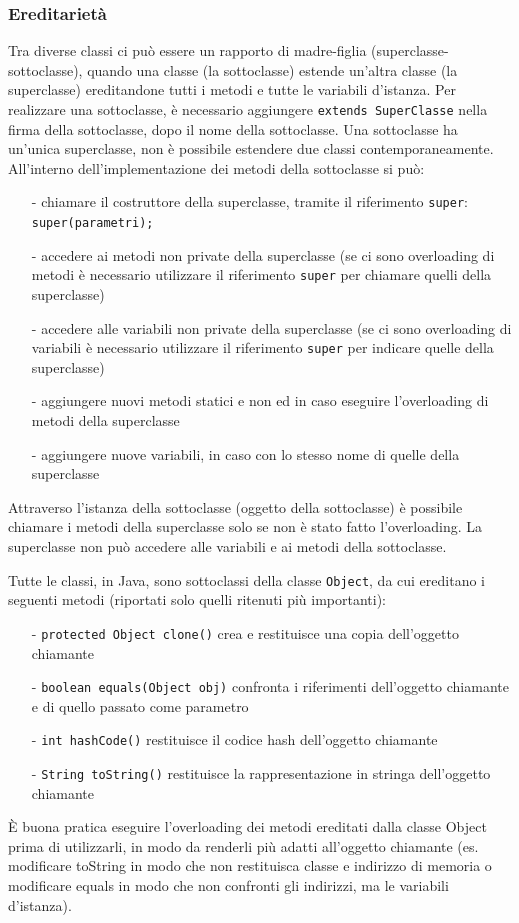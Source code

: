 \documentclass[a4paper]{article}
\begin{document}
\subsubsection*{Ereditarietà}
Tra diverse classi ci può essere un rapporto di madre-figlia (superclasse-sottoclasse), quando una classe (la sottoclasse)
estende un'altra classe (la superclasse) ereditandone tutti i metodi e tutte le variabili d'istanza.
Per realizzare una sottoclasse, è necessario aggiungere \verb|extends SuperClasse| nella firma della sottoclasse, dopo il nome
della sottoclasse. Una sottoclasse ha un'unica superclasse, non è possibile estendere due classi contemporaneamente. \\
All'interno dell'implementazione dei metodi della sottoclasse si può:
\begin{itemize} [topsep=3pt, itemsep=0pt]
	\item[-] chiamare il costruttore della superclasse, tramite il riferimento \verb|super|: \verb|super(parametri);|
	\item[-] accedere ai metodi non private della superclasse (se ci sono overloading di metodi è necessario utilizzare
	il riferimento \verb|super| per chiamare quelli della superclasse)
	\item[-] accedere alle variabili non private della superclasse (se ci sono overloading di variabili è necessario
	utilizzare il riferimento \verb|super| per indicare quelle della superclasse)
	\item[-] aggiungere nuovi metodi statici e non ed in caso eseguire l'overloading di metodi della superclasse
	\item[-] aggiungere nuove variabili, in caso con lo stesso nome di quelle della superclasse
\end{itemize}
Attraverso l'istanza della sottoclasse (oggetto della sottoclasse) è possibile chiamare i metodi della superclasse solo se
non è stato fatto l'overloading. La superclasse non può accedere alle variabili e ai metodi della sottoclasse.

Tutte le classi, in Java, sono sottoclassi della classe \verb|Object|, da cui ereditano i seguenti metodi (riportati solo quelli
ritenuti più importanti):
\begin{itemize} [topsep=3pt, itemsep=0pt]
	\item[-] \verb|protected Object clone()| crea e restituisce una copia dell'oggetto chiamante
	\item[-] \verb|boolean equals(Object obj)| confronta i riferimenti dell'oggetto chiamante e di quello passato come parametro
	\item[-] \verb|int hashCode()| restituisce il codice hash dell'oggetto chiamante
	\item[-] \verb|String toString()| restituisce la rappresentazione in stringa dell'oggetto chiamante
\end{itemize}
È buona pratica eseguire l'overloading dei metodi ereditati dalla classe Object prima di utilizzarli, in modo da renderli
più adatti all'oggetto chiamante (es. modificare toString in modo che non restituisca classe e indirizzo di memoria o modificare
equals in modo che non confronti gli indirizzi, ma le variabili d'istanza).
\end{document}
